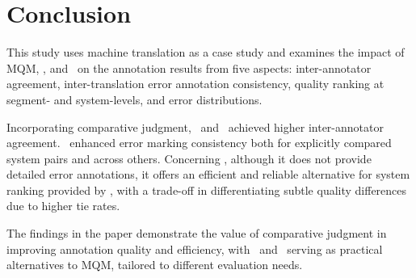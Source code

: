 \section{Conclusion}

This study uses machine translation as a case study and examines the impact of MQM, \sxsmqm, and \sxsqr~on the annotation results from five aspects: inter-annotator agreement, inter-translation error annotation consistency, quality ranking at segment- and system-levels, and error distributions. 

Incorporating comparative judgment, \sxsmqm~and \sxsqr~achieved higher inter-annotator agreement. \sxsmqm~enhanced error marking consistency both for explicitly compared system pairs and across others. Concerning \sxsqr, although it does not provide detailed error annotations, it offers an efficient and reliable alternative for system ranking provided by \sxsmqm, with a trade-off in differentiating subtle quality differences due to higher tie rates.

The findings in the paper demonstrate the value of comparative judgment in improving annotation quality and efficiency, with \sxsmqm~and \sxsqr~serving as practical alternatives to MQM, tailored to different evaluation needs.
